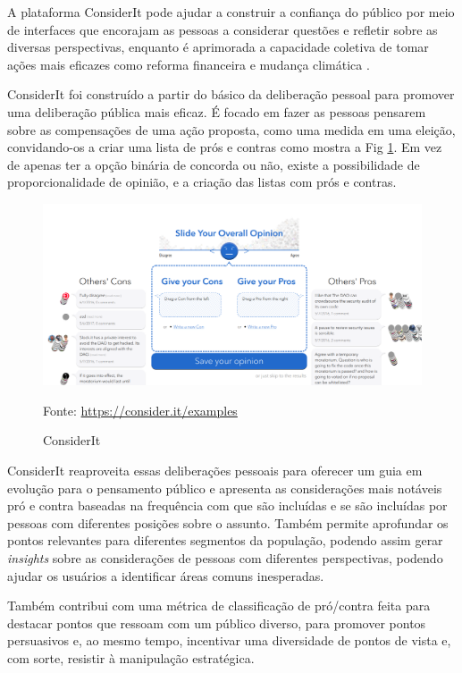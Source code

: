 A plataforma ConsiderIt pode ajudar a construir a confiança do público por meio de interfaces que encorajam as pessoas a considerar questões e refletir sobre as diversas perspectivas, enquanto é aprimorada a capacidade coletiva de tomar ações mais eficazes como reforma financeira e mudança climática \cite{bennett2012}.

ConsiderIt foi construído a partir do básico da deliberação pessoal para promover uma deliberação pública mais eficaz. É focado em fazer as pessoas pensarem sobre as compensações de uma ação proposta, como uma medida em uma eleição, convidando-os a criar uma lista de prós e contras como mostra a Fig \ref{fig04}. Em vez de apenas ter a opção binária de concorda ou não, existe a possibilidade de proporcionalidade de opinião, e a criação das listas com prós e contras. 

\begin{figure}[h]
	\centering
	\includegraphics[keepaspectratio=true,scale=0.25]{figuras/teste-considerit.png}
	\caption{ConsiderIt}
	Fonte: \url{https://consider.it/examples}
	\label{fig04}
\end{figure}


ConsiderIt reaproveita essas deliberações pessoais para oferecer um guia em evolução para o pensamento público e apresenta as considerações mais notáveis pró e contra baseadas na frequência com que são incluídas e se são incluídas por pessoas com diferentes posições sobre o assunto. Também permite aprofundar os pontos relevantes para diferentes segmentos da população, podendo assim gerar \textit{insights} sobre as considerações de pessoas com diferentes perspectivas, podendo ajudar os usuários a identificar áreas comuns inesperadas. 

Também contribui com uma métrica de classificação de pró/contra feita para destacar pontos que ressoam com um público diverso, para promover pontos persuasivos e, ao mesmo tempo, incentivar uma diversidade de pontos de vista e, com sorte, resistir à manipulação estratégica.



